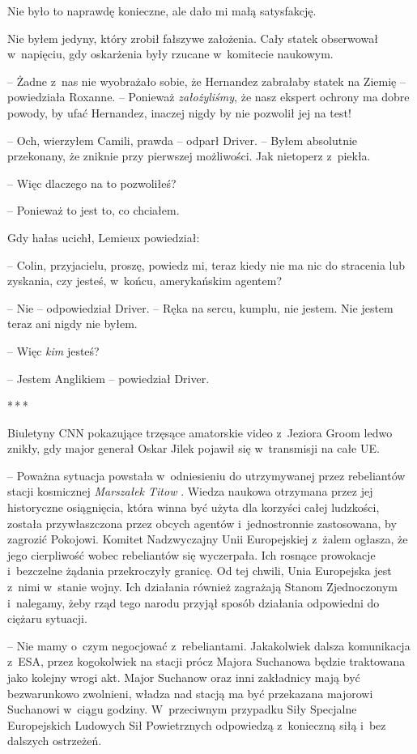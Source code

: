 \documentclass[oneside,polish,12pt,sfheadings]{mwbk}
\newcommand{\threeast}{\bigskip\par\centerline{*\,*\,*}\medskip\par}%
\begin{document}
Nie było to naprawdę konieczne, ale dało mi małą satysfakcję.

Nie byłem jedyny, który zrobił fałszywe założenia. Cały statek
obserwował w~napięciu, gdy oskarżenia były rzucane w~komitecie naukowym.

-- Żadne z~nas nie wyobrażało sobie, że Hernandez zabrałaby statek na
Ziemię -- powiedziała Roxanne. -- Ponieważ \emph{założyliśmy}, że nasz
ekspert ochrony ma dobre powody, by ufać Hernandez, inaczej nigdy by nie
pozwolił jej na test!

-- Och, wierzyłem Camili, prawda -- odparł Driver. -- Byłem absolutnie
przekonany, że zniknie przy pierwszej możliwości. Jak nietoperz z~piekła.

-- Więc dlaczego na to pozwoliłeś?

-- Ponieważ to jest to, co chciałem.

Gdy hałas ucichł, Lemieux powiedział:

-- Colin, przyjacielu, proszę, powiedz mi, teraz kiedy nie ma nic do
stracenia lub zyskania, czy jesteś, w~końcu, amerykańskim agentem?

-- Nie -- odpowiedział Driver. -- Ręka na sercu, kumplu, nie jestem. Nie
jestem teraz ani nigdy nie byłem.

-- Więc \emph{kim} jesteś?

-- Jestem Anglikiem -- powiedział Driver.

\threeast

Biuletyny CNN pokazujące trzęsące amatorskie video z~Jeziora Groom ledwo
znikły, gdy major generał Oskar Jilek pojawił się w~transmisji na całe
UE.

-- Poważna sytuacja powstała w~odniesieniu do utrzymywanej przez
rebeliantów stacji kosmicznej \emph{Marszałek Titow }. Wiedza naukowa
otrzymana przez jej historyczne osiągnięcia, która winna być użyta dla
korzyści całej ludzkości, została przywłaszczona przez obcych agentów i~jednostronnie zastosowana, by zagrozić Pokojowi. Komitet Nadzwyczajny
Unii Europejskiej z~żalem ogłasza, że jego cierpliwość wobec rebeliantów
się wyczerpała. Ich rosnące prowokacje i~bezczelne żądania przekroczyły
granicę. Od tej chwili, Unia Europejska jest z~nimi w~stanie wojny. Ich
działania również zagrażają Stanom Zjednoczonym i~nalegamy, żeby rząd
tego narodu przyjął sposób działania odpowiedni do ciężaru sytuacji.

-- Nie mamy o~czym negocjować z~rebeliantami. Jakakolwiek dalsza
komunikacja z~ESA, przez kogokolwiek na stacji prócz Majora Suchanowa
będzie traktowana jako kolejny wrogi akt. Major Suchanow oraz inni
zakładnicy mają być bezwarunkowo zwolnieni, władza nad stacją ma być
przekazana majorowi Suchanowi w~ciągu godziny. W~przeciwnym przypadku
Siły Specjalne Europejskich Ludowych Sił Powietrznych odpowiedzą z~konieczną siłą i~bez dalszych ostrzeżeń.
\end{document}
